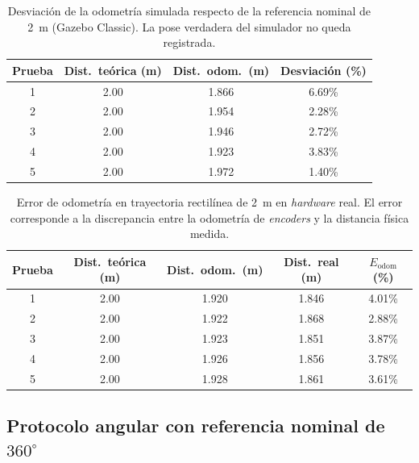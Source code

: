 \begin{appendices}
\begin{table}[H]
\centering
\caption{Desviación de la odometría simulada respecto de la referencia nominal de 2~m (Gazebo Classic). La pose verdadera del simulador no queda registrada.}
\label{tab:odom_recta_sim}
\small
\begin{tabular}{cccc}
\toprule
\textbf{Prueba} & \textbf{Dist.\ teórica (m)} & \textbf{Dist.\ odom.\ (m)} & \textbf{Desviación (\%)} \\
\midrule
1 & 2.00 & 1.866 & 6.69\% \\
2 & 2.00 & 1.954 & 2.28\% \\
3 & 2.00 & 1.946 & 2.72\% \\
4 & 2.00 & 1.923 & 3.83\% \\
5 & 2.00 & 1.972 & 1.40\% \\

\bottomrule
\end{tabular}
\end{table}

\begin{table}[H]
\centering
\caption{Error de odometría en trayectoria rectilínea de 2~m en \textit{hardware} real. El error corresponde a la discrepancia entre la odometría de \textit{encoders} y la distancia física medida.}
\label{tab:odom_recta_real}
\small
\begin{tabular}{ccccc}
\toprule
\textbf{Prueba} & \textbf{Dist.\ teórica (m)} & \textbf{Dist.\ odom.\ (m)} & \textbf{Dist.\ real (m)} & \textbf{$E_{\mathrm{odom}}$ (\%)} \\
\midrule
1 & 2.00 & 1.920 & 1.846 & 4.01\% \\
2 & 2.00 & 1.922 & 1.868 & 2.88\% \\
3 & 2.00 & 1.923 & 1.851 & 3.87\% \\
4 & 2.00 & 1.926 & 1.856 & 3.78\% \\
5 & 2.00 & 1.928 & 1.861 & 3.61\% \\

\bottomrule
\end{tabular}
\end{table}

\subsection{Protocolo angular con referencia nominal de \texorpdfstring{$360^\circ$}{360°}}


\end{appendices}
